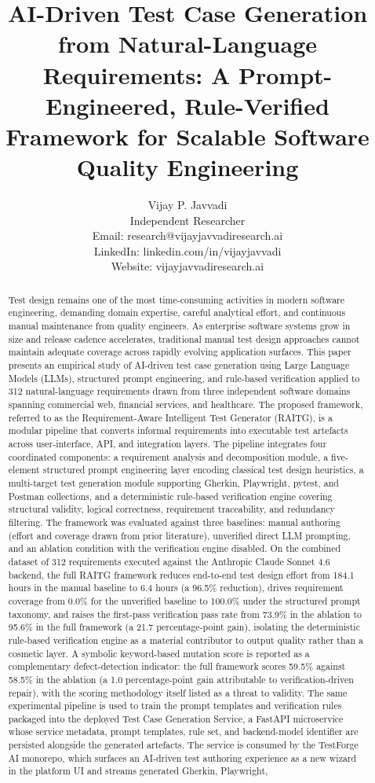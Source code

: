 \documentclass[11pt,letterpaper]{article}
\title{AI-Driven Test Case Generation from Natural-Language Requirements: A Prompt-Engineered, Rule-Verified Framework for Scalable Software Quality Engineering}
\author{Vijay P. Javvadi\\
Independent Researcher\\
Email: research@vijayjavvadiresearch.ai\\
LinkedIn: linkedin.com/in/vijayjavvadi\\
Website: vijayjavvadiresearch.ai
}
\begin{document}
\maketitle

\begin{abstract}
Test design remains one of the most time-consuming activities in modern software engineering, demanding domain expertise, careful analytical effort, and continuous manual maintenance from quality engineers. As enterprise software systems grow in size and release cadence accelerates, traditional manual test design approaches cannot maintain adequate coverage across rapidly evolving application surfaces. This paper presents an empirical study of AI-driven test case generation using Large Language Models (LLMs), structured prompt engineering, and rule-based verification applied to 312 natural-language requirements drawn from three independent software domains spanning commercial web, financial services, and healthcare. The proposed framework, referred to as the Requirement-Aware Intelligent Test Generator (RAITG), is a modular pipeline that converts informal requirements into executable test artefacts across user-interface, API, and integration layers. The pipeline integrates four coordinated components: a requirement analysis and decomposition module, a five-element structured prompt engineering layer encoding classical test design heuristics, a multi-target test generation module supporting Gherkin, Playwright, pytest, and Postman collections, and a deterministic rule-based verification engine covering structural validity, logical correctness, requirement traceability, and redundancy filtering. The framework was evaluated against three baselines: manual authoring (effort and coverage drawn from prior literature), unverified direct LLM prompting, and an ablation condition with the verification engine disabled. On the combined dataset of 312 requirements executed against the Anthropic Claude Sonnet 4.6 backend, the full RAITG framework reduces end-to-end test design effort from 184.1 hours in the manual baseline to 6.4 hours (a 96.5\% reduction), drives requirement coverage from 0.0\% for the unverified baseline to 100.0\% under the structured prompt taxonomy, and raises the first-pass verification pass rate from 73.9\% in the ablation to 95.6\% in the full framework (a 21.7 percentage-point gain), isolating the deterministic rule-based verification engine as a material contributor to output quality rather than a cosmetic layer. A symbolic keyword-based mutation score is reported as a complementary defect-detection indicator: the full framework scores 59.5\% against 58.5\% in the ablation (a 1.0 percentage-point gain attributable to verification-driven repair), with the scoring methodology itself listed as a threat to validity. The same experimental pipeline is used to train the prompt templates and verification rules packaged into the deployed Test Case Generation Service, a FastAPI microservice whose service metadata, prompt templates, rule set, and backend-model identifier are persisted alongside the generated artefacts. The service is consumed by the TestForge AI monorepo, which surfaces an AI-driven test authoring experience as a new wizard in the platform UI and streams generated Gherkin, Playwright, 
\end{abstract}
\end{document}
